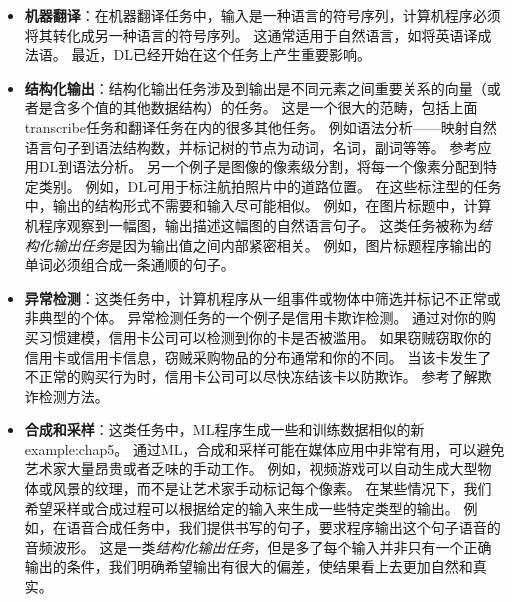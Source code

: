 \begin{itemize}
    \item \textbf{机器翻译}：在机器翻译任务中，输入是一种语言的符号序列，计算机程序必须将其转化成另一种语言的符号序列。
    这通常适用于自然语言，如将英语译成法语。
    最近，\gls{DL}已经开始在这个任务上产生重要影响\citep{Sutskever-et-al-NIPS2014,Bahdanau-et-al-ICLR2015-small}。

    \item \textbf{结构化输出}：结构化输出任务涉及到输出是不同元素之间重要关系的向量（或者是含多个值的其他数据结构）的任务。
    这是一个很大的范畴，包括上面\gls{transcribe}任务和翻译任务在内的很多其他任务。
    例如语法分析——映射自然语言句子到语法结构数，并标记树的节点为动词，名词，副词等等。
    参考\cite{Collobert-AISTATS2011}应用\gls{DL}到语法分析。
    另一个例子是图像的像素级分割，将每一个像素分配到特定类别。
    例如，\gls{DL}可用于标注航拍照片中的道路位置\citep{MnihHinton2010}。
    在这些标注型的任务中，输出的结构形式不需要和输入尽可能相似。
    例如，在图片标题中，计算机程序观察到一幅图，输出描述这幅图的自然语言句子\citep{Kiros-et-al-ICML2014,Kiros-et-al-arxiv2014,Mao-et-al-2014,Vinyals-et-al-CVPR2015,Donahue-et-al-arxiv2014,Karpathy+Li-CVPR2015,Fang-et-al-CVPR2015,Xu-et-al-ICML2015}。
    这类任务被称为\emph{结构化输出任务}是因为输出值之间内部紧密相关。
    例如，图片标题程序输出的单词必须组合成一条通顺的句子。


    \item \textbf{异常检测}：这类任务中，计算机程序从一组事件或物体中筛选并标记不正常或非典型的个体。
    异常检测任务的一个例子是信用卡欺诈检测。
    通过对你的购买习惯建模，信用卡公司可以检测到你的卡是否被滥用。
    如果窃贼窃取你的信用卡或信用卡信息，窃贼采购物品的分布通常和你的不同。
    当该卡发生了不正常的购买行为时，信用卡公司可以尽快冻结该卡以防欺诈。
    参考\cite{chandola2009anomaly}了解欺诈检测方法。

    \item \textbf{合成和采样}：这类任务中，\gls{ML}程序生成一些和训练数据相似的新\gls{example:chap5}。
    通过\gls{ML}，合成和采样可能在媒体应用中非常有用，可以避免艺术家大量昂贵或者乏味的手动工作。
    例如，视频游戏可以自动生成大型物体或风景的纹理，而不是让艺术家手动标记每个像素\citep{Luo+al-AISTATS2013-small}。
    在某些情况下，我们希望采样或合成过程可以根据给定的输入来生成一些特定类型的输出。
    例如，在语音合成任务中，我们提供书写的句子，要求程序输出这个句子语音的音频波形。
    这是一类\emph{结构化输出任务}，但是多了每个输入并非只有一个正确输出的条件，我们明确希望输出有很大的偏差，使结果看上去更加自然和真实。


\end{itemize}
